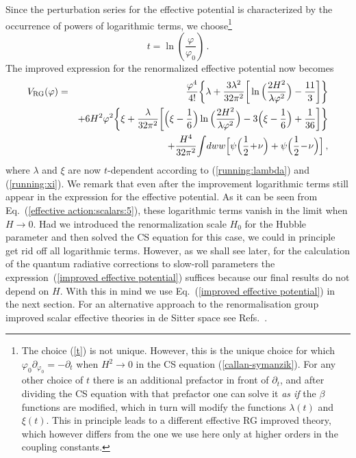 Since the perturbation series for the effective potential is
characterized by the occurrence of powers of logarithmic terms, we
choose\footnote{The choice (\ref{t}) is not unique. However, this
is the unique choice for which $\varphi_0\partial_{\varphi_0} =
-\partial_t$ when $H^2 \rightarrow 0$ in the CS equation
(\ref{callan-symanzik}). For any other choice of $t$ there is an
additional prefactor in front of $\partial_t$, and after dividing
the CS equation with that prefactor one can solve it \textit{as if}
the $\beta$ functions are modified, which in turn will modify the
functions $\lambda(t)$ and $\xi(t)$. This in principle leads to a
different effective RG improved theory, which however differs from
the one we use here only at higher orders in the coupling constants.}
\begin{equation}
t = \ln\left(\frac{\varphi}{\varphi_{0}}\right)\,.\label{t}
\end{equation}
The improved expression for the renormalized effective potential
now becomes
\begin{eqnarray}
V_{\mathrm{RG}}(\varphi)
&=&\frac{\varphi^4}{4!}\bigg\{\lambda+\frac{3\lambda^{2}}{32\pi^{2}}
      \bigg[\ln\Big(\frac{2H^{2}}{\lambda\varphi^{2}}\Big)-\frac{11}{3}\bigg]\bigg\}
\nonumber\\
  & &    + 6H^2\varphi^2\bigg\{\xi+\frac{\lambda}{32\pi^{2}}\bigg[\Big(\xi-\frac{1}{6}\Big)
                       \ln\Big(\frac{2H^{2}}{\lambda\varphi^{2}}\Big)
                       -3\Big(\xi-\frac{1}{6}\Big)+\frac{1}{36}\bigg]\bigg\}
\label{improved effective potential}
\\
&&\hskip 0.cm
     +\frac{H^4}{32\pi^2}
        \!\int\! dww
              \Big[\psi\Big(\frac{1}{2}\!+\!\nu\Big)
                              + \psi\Big(\frac{1}{2}\!-\!\nu\Big)\Big]
\nonumber
\,,
\end{eqnarray}
where $\lambda$ and $\xi$ are now $t$-dependent according to
(\ref{running:lambda}) and (\ref{running:xi}). We remark that even
after the improvement logarithmic terms still appear in the
expression for the effective potential. As it can be seen
from Eq.~(\ref{effective action:scalars:5}),
these logarithmic terms vanish in the limit when $H\rightarrow 0$.
Had we introduced the renormalization scale $H_0$ for the Hubble parameter
and then solved the CS equation for this case, we
could in principle get rid off all logarithmic terms.
However, as we shall see later, for the calculation
of the quantum radiative corrections to slow-roll parameters the
expression~(\ref{improved effective potential}) suffices
because our final results do not depend on $H$.
With this in mind we use 
Eq.~(\ref{improved effective potential}) in the next section.
For an alternative approach to the renormalisation group improved scalar
 effective theories in de Sitter space see 
Refs.~\cite{Elizalde:1993qh,Elizalde:1994ds}. 

